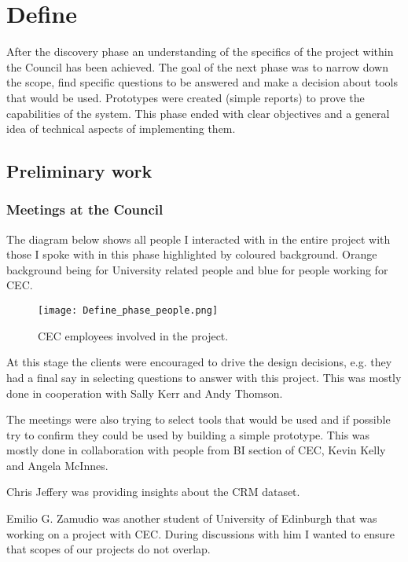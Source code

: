 	\section{Define}
	
After the discovery phase an understanding of the specifics of the project within the Council has been achieved. The goal of the next phase was to narrow down the scope, find specific questions to be answered and make a decision about tools that would be used. Prototypes were created (simple reports) to prove the capabilities of the system. This phase ended with clear objectives and a general idea of technical aspects of implementing them.	
	
		\subsection{Preliminary work}
		
			\subsubsection{Meetings at the Council}
			
The diagram below shows all people I interacted with in the entire project with those I spoke with in this phase highlighted by coloured background. Orange background being for University related people and blue for people working for CEC.

\begin{figure}[hp]
\centering
     \texttt{[image: Define\_phase\_people.png]}
      \caption{CEC employees involved in the project.}
       \label{normal_case}
\end{figure}
	
At this stage the clients were encouraged to drive the design decisions, e.g. they had a final say in selecting questions to answer with this project. This was mostly done in cooperation with Sally Kerr and Andy Thomson.

The meetings were also trying to select tools that would be used and if possible try to confirm they could be used by building a simple prototype. This was mostly done in collaboration with people from BI section of CEC, Kevin Kelly and Angela McInnes.

Chris Jeffery was providing insights about the CRM dataset.

Emilio G. Zamudio was another student of University of Edinburgh that was working on a project with CEC. During discussions with him I wanted to ensure that scopes of our projects do not overlap.
